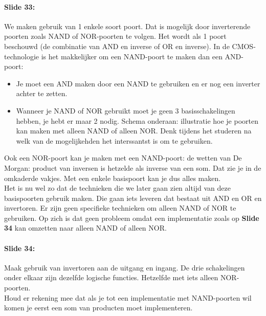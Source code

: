 \documentclass[10pt,a4paper]{book}
\begin{document}
\paragraph{Slide 33:} We maken gebruik van 1 enkele soort poort. Dat is mogelijk door inverterende poorten zoals NAND of NOR-poorten te volgen. Het wordt als 1 poort beschouwd (de combinatie van AND en inverse of OR en inverse). In de CMOS-technologie is het makkelijker om een NAND-poort te maken dan een AND-poort: 
\begin{itemize}
\item Je moet een AND maken door een NAND te gebruiken en er nog een inverter achter te zetten.
\item Wanneer je NAND of NOR gebruikt moet je geen 3 basisschakelingen hebben, je hebt er maar 2 nodig. Schema onderaan: illustratie hoe je poorten kan maken met alleen NAND of alleen NOR. Denk tijdens het studeren na welk van de mogelijkehden het interssantst is om te gebruiken. 
\end{itemize}
Ook een NOR-poort kan je maken met een NAND-poort: de wetten van De Morgan: product van inversen is hetzelde als inverse van een som. Dat zie je in de omkaderde vakjes. Met een enkele basispoort kan je dus alles maken.\\
Het is nu wel zo dat de technieken die we later gaan zien altijd van deze basispoorten gebruik maken. Die gaan iets leveren dat bestaat uit AND en OR en invertoren. Er zijn geen specifieke technieken om alleen NAND of NOR te gebruiken. Op zich is dat geen probleem omdat een implementatie zoals op \textbf{Slide 34} kan omzetten naar alleen NAND of alleen NOR. 

\paragraph{Slide 34:} Maak gebruik van invertoren aan de uitgang en ingang. De drie schakelingen onder elkaar zijn dezelfde logische functies. Hetzelfde met iets alleen NOR-poorten.\\
Houd er rekening mee dat als je tot een implementatie met NAND-poorten wil komen je eerst een som van producten moet implementeren. 
\end{document}
